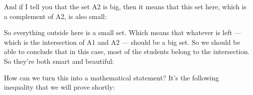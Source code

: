 \documentclass[pdftex, brazil, 12pt, twoside]{article}
\begin{document}
And if I tell you that the set A2 is big, then it means that
this set here, which is a complement
of A2, is also small:

\begin{figure}[H]
  \begin{center}
  \end{center}
\end{figure}

So everything outside here is a small set.
Which means that whatever is left ---
which is the intersection of A1 and A2
--- should be a big set.
So we should be able to conclude that in this case,
most of the students belong to the intersection.
So they're both smart and beautiful:

\begin{figure}[H]
  \begin{center}
  \end{center}
\end{figure}

How can we turn this into a mathematical statement?
It's the following inequality that we will prove shortly:

\begin{figure}[H]
  \begin{center}
  \end{center}
\end{figure}
\end{document}
